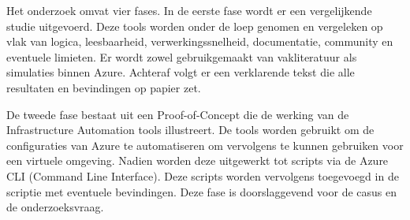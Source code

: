 \begin{comment}

Hier beschrijf je hoe je van plan bent het onderzoek te voeren. Welke onderzoekstechniek ga je toepassen om elk van je onderzoeksvragen te beantwoorden? Gebruik je hiervoor literatuurstudie, interviews met belanghebbenden (bv.~voor requirements-analyse), experimenten, simulaties, vergelijkende studie, risico-analyse, PoC, \ldots?

Valt je onderwerp onder één van de typische soorten bachelorproeven die besproken zijn in de lessen Research Methods (bv.\ vergelijkende studie of risico-analyse)? Zorg er dan ook voor dat we duidelijk de verschillende stappen terug vinden die we verwachten in dit soort onderzoek!

Vermijd onderzoekstechnieken die geen objectieve, meetbare resultaten kunnen opleveren. Enquêtes, bijvoorbeeld, zijn voor een bachelorproef informatica meestal \textbf{niet geschikt}. De antwoorden zijn eerder meningen dan feiten en in de praktijk blijkt het ook bijzonder moeilijk om voldoende respondenten te vinden. Studenten die een enquête willen voeren, hebben meestal ook geen goede definitie van de populatie, waardoor ook niet kan aangetoond worden dat eventuele resultaten representatief zijn.

Uit dit onderdeel moet duidelijk naar voor komen dat je bachelorproef ook technisch voldoen\-de diepgang zal bevatten. Het zou niet kloppen als een bachelorproef informatica ook door bv.\ een student marketing zou kunnen uitgevoerd worden.

Je beschrijft ook al welke tools (hardware, software, diensten, \ldots) je denkt hiervoor te gebruiken of te ontwikkelen.

Probeer ook een tijdschatting te maken. Hoe lang zal je met elke fase van je onderzoek bezig zijn en wat zijn de concrete \emph{deliverables} in elke fase?

\end{comment}

Het onderzoek omvat vier fases. In de eerste fase wordt er een vergelijkende studie uitgevoerd. Deze tools worden onder de loep genomen en vergeleken op vlak van logica, leesbaarheid, verwerkingssnelheid, documentatie, community en eventuele limieten. Er wordt zowel gebruikgemaakt van vakliteratuur als simulaties binnen Azure. Achteraf volgt er een verklarende tekst die alle resultaten en bevindingen op papier zet. 

De tweede fase bestaat uit een Proof-of-\newline{}Concept die de werking van de Infrastructure Automation tools illustreert. De tools worden gebruikt om de configuraties van Azure te automatiseren om vervolgens te kunnen gebruiken voor een virtuele omgeving. Nadien worden deze uitgewerkt tot scripts via de Azure CLI (Command Line Interface). Deze scripts worden vervolgens toegevoegd in de scriptie met eventuele bevindingen. Deze fase is doorslaggevend voor de casus en de onderzoeksvraag.

